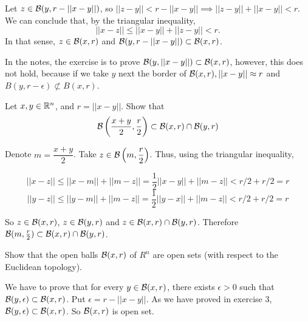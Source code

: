 Let $z \in \mathcal{B}(y, r - ||x-y||)$, so $||z - y|| < r - ||x - y|| \implies ||z-y||
+ ||x-y|| < r$. We can conclude
that, by the triangular inequality,  
$$||x - z|| \le ||x - y|| + ||z - y|| < r.$$ 
In that sense, $z \in \mathcal{B}(x,r)$ and $\mathcal{B}(y, r - ||x - y||) \subset \mathcal{B}(x,r)$.

\begin{remark}
    In the notes, the exercise is to prove $\mathcal{B}(y,||x-y||) \subset \mathcal{B}(x,r)$,
    however, this does not hold, because if we take $y$ next the border of
    $\mathcal{B}(x,r), ||x - y|| \approx r$ and $B(y,r -\epsilon) \not \subset B(x,r)$.
\end{remark}

\noindent\linia

\begin{exercise}
    Let $x, y \in \mathbb{R}^n$, and $r = ||x - y||$. Show that
    $$
    \mathcal{B}\left(\frac{x + y}{2}, \frac{r}{2}\right) \subset \mathcal{B}(x, r) \cap \mathcal{B}(y, r)
    $$
\end{exercise}

Denote $m = \dfrac{x+y}{2}$. Take $z \in \mathcal{B}\left(m, \dfrac{r}{2}\right)$.
Thus, using the triangular inequality,

$$||x - z|| \le ||x - m|| + ||m - z|| = \frac{1}{2}||x - y|| + ||m - z|| < r/2
+ r/2 = r$$
$$||y - z|| \le ||y - m|| + ||m - z|| = \frac{1}{2}||y - x|| + ||m - z|| < r/2
+ r/2 = r$$

So $z \in \mathcal{B}(x,r)$, $z \in \mathcal{B}(y, r)$ and $z \in \mathcal{B}(x,r) \cap \mathcal{B}(y, r)$.
Therefore $\mathcal{B}(m, \frac{r}{2}) \subset \mathcal{B}(x, r) \cap \mathcal{B}(y, r)$.

\noindent\linia

\begin{exercise}
    Show that the open balls $\mathcal{B}(x, r)$ of $R^n$ are open sets (with respect
    to the Euclidean topology).
\end{exercise}

We have to prove that for every $y \in \mathcal{B}(x, r)$, there exists $\epsilon > 0$ such
that $\mathcal{B}(y, \epsilon) \subset \mathcal{B}(x, r)$. Put $\epsilon = r - ||x - y||$. As
we have proved in exercise 3, $\mathcal{B}(y, \epsilon) \subset \mathcal{B}(x,r)$. 
So $\mathcal{B}(x,r)$ is open set. 

\noindent\linia

